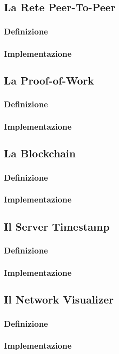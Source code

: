 \subsection{La Rete Peer-To-Peer}
%
\subsubsection{Definizione}
%
\subsubsection{Implementazione}
%
\subsection{La Proof-of-Work}
%
\subsubsection{Definizione}
%
\subsubsection{Implementazione}
%
\subsection{La Blockchain}
%
\subsubsection{Definizione}
%
\subsubsection{Implementazione}
%
\subsection{Il Server Timestamp}
%
\subsubsection{Definizione}
%
\subsubsection{Implementazione}
%
\subsection{Il Network Visualizer}
%
\subsubsection{Definizione}
%
\subsubsection{Implementazione}
%